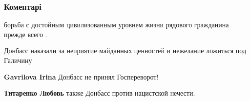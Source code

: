  
 
 
 
 
\subsubsection{Коментарі}

\begin{itemize}
 
борьба с достойным цивилизованным уровнем жизни рядового гражданина прежде всего .

 
Донбасс наказали за неприятие майданных ценностей и нежелание ложиться под Галичину

\begin{itemize}
 
\textbf{Gavrilova Irina} Донбасс не принял Госпереворот!

 
\textbf{Титаренко Любовь} также Донбасс против нацистской нечести.

 

\end{itemize}
\end{itemize}
